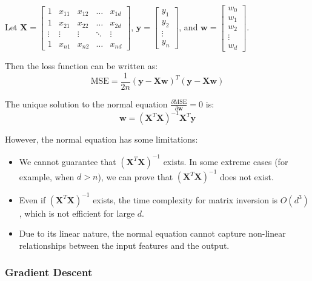\documentclass[a4paper,12pt]{article}
\begin{document}
Let $\mathbf{X} = \begin{bmatrix} 1 & x_{11} & x_{12} & \ldots & x_{1d} \\ 1 & x_{21} & x_{22} & \ldots & x_{2d} \\ \vdots & \vdots & \vdots & \ddots & \vdots \\ 1 & x_{n1} & x_{n2} & \ldots & x_{nd} \end{bmatrix}$, $\mathbf{y} = \begin{bmatrix} y_1 \\ y_2 \\ \vdots \\ y_n \end{bmatrix}$, and $\mathbf{w} = \begin{bmatrix} w_0 \\ w_1 \\ w_2 \\ \vdots \\ w_d \end{bmatrix}$.

Then the loss function can be written as:
\begin{equation*}
  \text{MSE} = \frac{1}{2n} (\mathbf{y} - \mathbf{X} \mathbf{w})^T (\mathbf{y} - \mathbf{X} \mathbf{w})
\end{equation*}

The unique solution to the normal equation $\frac{\partial \text{MSE}}{\partial \mathbf{w}} = 0$ is:
\begin{equation*}
  \mathbf{w} = (\mathbf{X}^T \mathbf{X})^{-1} \mathbf{X}^T \mathbf{y}
\end{equation*}

However, the normal equation has some limitations:
\begin{itemize}
  \item We cannot guarantee that $(\mathbf{X}^T \mathbf{X})^{-1}$ exists. In some extreme cases (for example, when $d > n$), we can prove that $(\mathbf{X}^T \mathbf{X})^{-1}$ does not exist.
  \item Even if $(\mathbf{X}^T \mathbf{X})^{-1}$ exists, the time complexity for matrix inversion is $O(d^3)$, which is not efficient for large $d$.
  \item Due to its linear nature, the normal equation cannot capture non-linear relationships between the input features and the output.
\end{itemize}

\subsubsection{Gradient Descent}
\end{document}
